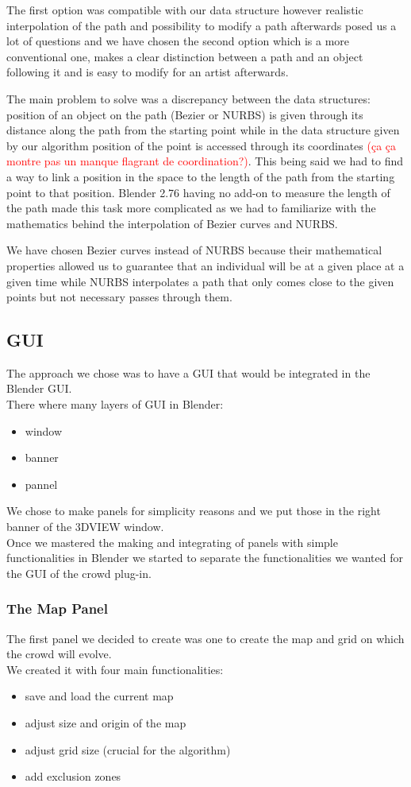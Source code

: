 The first option was compatible with our data structure however realistic interpolation of the path and possibility to modify a path afterwards posed us a lot of questions and we have chosen the second option which is a more conventional one, makes a clear distinction between a path and an object following it and is easy to modify for an artist afterwards. 

The main problem to solve was a discrepancy between the data structures: position of an object on the path (Bezier or NURBS) is given through its distance along the path from the starting point while in the data structure given by our algorithm position of the point is accessed through its coordinates \textcolor{red}{(ça ça montre pas un manque flagrant de coordination?)}. This being said we had to find a way to link a position in the space to the length of the path from the starting point to that position. Blender 2.76 having no add-on to measure the length of the path made this task more complicated as we had to familiarize with the mathematics behind the interpolation of Bezier curves and NURBS.   

We have chosen Bezier curves instead of NURBS because their mathematical properties allowed us to guarantee that an individual will be at a given place at a given time while NURBS interpolates a path that only comes close to the given points but not necessary passes through them.

\subsection{GUI}
The approach we chose was to have a GUI that would be integrated in the Blender GUI.\\
There where many layers of GUI in Blender:
\begin{itemize}
\item window
\item banner
\item pannel
\end{itemize}

We chose to make panels for simplicity reasons and we put those in the right banner of the 3DVIEW window.\\
Once we mastered the making and integrating of panels with simple functionalities in Blender we started to separate the functionalities we wanted for the GUI of the crowd plug-in.

\subsubsection{The Map Panel}
The first panel we decided to create was one to create the map and grid on which the crowd will evolve.\\
We created it with four main functionalities:
\begin{itemize}
\item save and load the current map
\item adjust size and origin of the map
\item adjust grid size (crucial for the algorithm)
\item add exclusion zones
\end{itemize}



